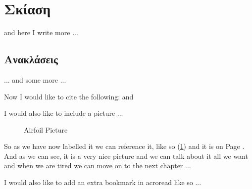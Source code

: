 \section{Σκίαση}
and here I write more ...\cite{texbook}

\subsection{Aνακλάσεις}
... and some more ...

Now I would like to cite the following: \cite{latex} and \cite{texbook}

I would also like to include a picture ...

\begin{figure}[!htbp]
  \begin{center}
    \leavevmode
    \ifpdf
    \else
    \fi
    \caption{Airfoil Picture}
    \label{FigAir}
  \end{center}
\end{figure}


So as we have now labelled it we can reference it, like so (\ref{FigAir}) and it
is on Page \pageref{FigAir}. And as we can see, it is a very nice picture and we
can talk about it all we want and when we are tired we can move on to the next
chapter ...

I would also like to add an extra bookmark in acroread like so ...
\ifpdf
\fi


